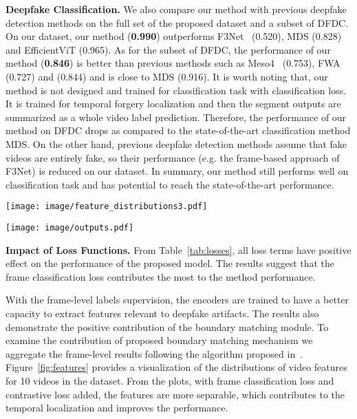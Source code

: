 \documentclass[conference, a4paper]{IEEEtran}
\makeatletter
\newcommand*{\eg}{e.g.\@\xspace}
\makeatother
\begin{document}
\noindent \textbf{Deepfake Classification.} We also compare our method with previous deepfake detection methods on the full set of the proposed dataset and a subset of DFDC. On our dataset, our method (\textbf{0.990}) outperforms F3Net~\cite{qian_thinking_2020} (0.520), MDS (0.828) and EfficientViT (0.965). As for the subset of DFDC, the performance of our method (\textbf{0.846}) is better than previous methods such as Meso4~\cite{afchar_mesonet_2018} (0.753), FWA~\cite{li_exposing_2019} (0.727) and \cite{mittal_emotions_2020} (0.844) and is close to MDS (0.916). It is worth noting that, our method is not designed and trained for classification task with classification loss. It is trained for temporal forgery localization and then the segment outputs are summarized as a whole video label prediction. Therefore, the performance of our method on DFDC drops as compared to the state-of-the-art classification method MDS. On the other hand, previous deepfake detection methods assume that fake videos are entirely fake, so their performance (\eg the frame-based approach of F3Net) is reduced on our dataset. In summary, our method still performs well on classification task and has potential to reach the state-of-the-art performance.





\begin{figure*}[t]
\centering
\texttt{[image: image/feature\_distributions3.pdf]}
\caption{\textbf{Feature distribution in PCA subspace.} Each point is the features of a video frame.}
\label{fig:features}
\end{figure*}

\begin{figure*}[t]
\centering
\texttt{[image: image/outputs.pdf]}
\caption{\textbf{Visualization of boundary map outputs.} The first column illustrates the modality-wise boundary map outputs for a real video. The rest of the columns illustrate the modality-wise boundary map outputs for the corresponding fake videos. \textit{GT: ground truth} and \textit{mod: modified}.} 
\label{fig:outputs}
\end{figure*}

\noindent \textbf{Impact of Loss Functions.} From Table~\ref{tab:losses}, all loss terms have positive effect on the performance of the proposed model. The results suggest that the frame classification loss contributes the most to the method performance. 

With the frame-level labels supervision, the encoders are trained to have a better capacity to extract features relevant to deepfake artifacts. The results also demonstrate the positive contribution of the boundary matching module. To examine the contribution of proposed boundary matching mechanism we aggregate the frame-level results following the algorithm proposed in~\cite{zhao_temporal_2017}. Figure~\ref{fig:features} provides a visualization of the distributions of video features  for 10 videos in the dataset. From the plots, with frame classification loss and contrastive loss added, the features are more separable, which contributes to the temporal localization and improves the performance.
\end{document}
